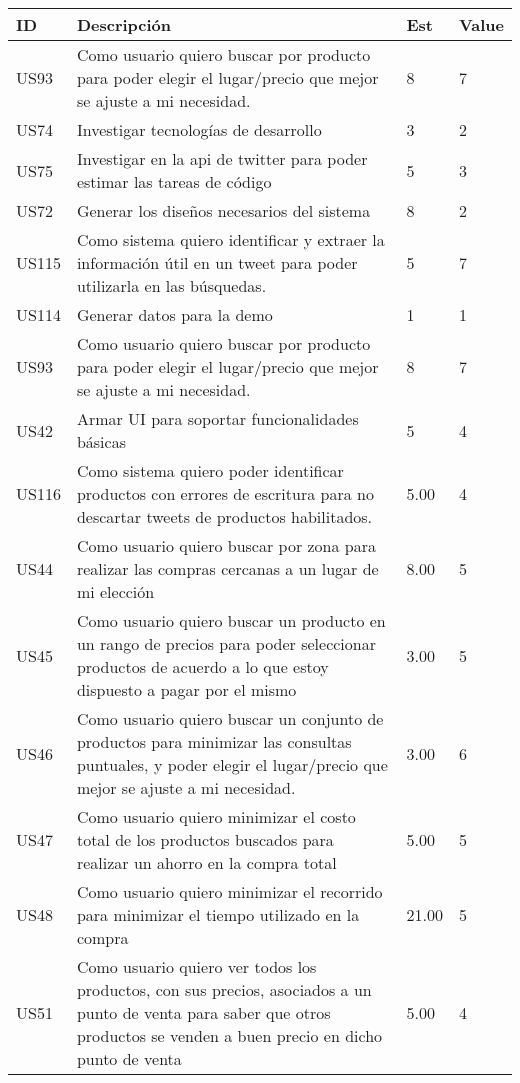 \begin{tabular}{|p{1cm}|p{10cm}|p{1cm}|p{1cm}|}
\hline
\hline
\textbf{ID}&\textbf{Descripción}&\textbf{Est}&\textbf{Value}\\
\hline
US93&Como usuario quiero buscar por producto para poder elegir el lugar/precio que mejor se ajuste a mi necesidad.& 8& 7\\
\hline
US74&Investigar tecnologías de desarrollo&3&2\\
\hline
US75&Investigar en la api de twitter para poder estimar las tareas de código&5&3\\
\hline
US72&Generar los diseños necesarios del sistema&8&2\\
\hline
US115&Como sistema quiero identificar y extraer la información útil en un tweet para poder utilizarla en las búsquedas.&5&7\\
\hline
US114&Generar datos para la demo&1&1\\
\hline
US93&Como usuario quiero buscar por producto para poder elegir el lugar/precio que mejor se ajuste a mi necesidad.& 8& 7\\
\hline
US42&Armar UI para soportar funcionalidades básicas& 5& 4\\
\hline
US116& Como sistema quiero poder identificar productos con errores de escritura para no descartar tweets de productos habilitados. &5.00&4\\ 
\hline
US44 &Como usuario quiero buscar por zona para realizar las compras cercanas a un lugar de mi elección &8.00&5\\ 
\hline	
US45 &Como usuario quiero buscar un producto en un rango de precios para poder seleccionar productos de acuerdo a lo que estoy dispuesto a pagar por el mismo &3.00&5\\ 
\hline	
US46 &Como usuario quiero buscar un conjunto de productos para minimizar las consultas puntuales, y poder elegir el lugar/precio que mejor se ajuste a mi necesidad. &3.00&6\\ 
\hline	
US47 &Como usuario quiero minimizar el costo total de los productos buscados para realizar un ahorro en la compra total &5.00&5\\ 
\hline	
US48 &Como usuario quiero minimizar el recorrido para minimizar el tiempo utilizado en la compra &21.00&5\\ 
\hline	
US51 &Como usuario quiero ver todos los productos, con sus precios, asociados a un punto de venta para saber que otros productos se venden a buen precio en dicho punto de venta &5.00&4\\ 

\end{tabular}
